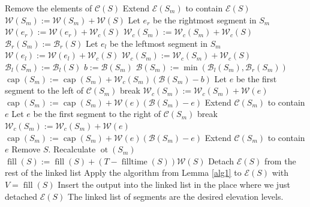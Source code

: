 \documentclass[11pt,a4paper]{article}
\DeclareMathOperator{\capp}{cap}
\DeclareMathOperator{\ot}{ot}
\DeclareMathOperator{\Fill}{fill}
\DeclareMathOperator{\filltime}{filltime}
\begin{document}
\begin{algorithmic}[1]
            \State Remove the elements of $\mathcal{C}(S)$ \label{a2:remcs}
            \State Extend $\mathcal{E}(S_m)$ to contain $\mathcal{E}(S)$ \label{a2:extend}
            \State $\mathcal{W}(S_m) := \mathcal{W}(S_m) + \mathcal{W}(S)$ \label{a2:addwsm}
              \State Let $e_r$ be the rightmost segment in $S_m$ \label{a2:geter2}
              \State $\mathcal{W}(e_r) := \mathcal{W}(e_r) + \mathcal{W}_c(S)$ \label{a2:addwer}
                \State $\mathcal{W}_c(S_m) := \mathcal{W}_c(S_m) + \mathcal{W}_c(S)$
              \EndIf
              \State $\mathcal{B}_r(S_m) := \mathcal{B}_r(S)$ \label{a2:bru}
            \Else
              \State Let $e_l$ be the leftmost segment in $S_m$
              \State $\mathcal{W}(e_l) := \mathcal{W}(e_l) + \mathcal{W}_c(S)$
                \State $\mathcal{W}_c(S_m) := \mathcal{W}_c(S_m) + \mathcal{W}_c(S)$
              \EndIf
              \State $\mathcal{B}_l(S_m) := \mathcal{B}_l(S)$ \label{a2:blu}
            \EndIf
            \State $b := \mathcal{B}(S_m)$
            \State $\mathcal{B}(S_m) := \min(\mathcal{B}_l(S_m), \mathcal{B}_r(S_m))$ \label{a2:bu}
            \State $\capp(S_m) := \capp(S_m) + \mathcal{W}_c(S_m)(\mathcal{B}(S_m) - b)$ \label{a2:inccap}
             \label{a2:walkstart}
              \State Let $e$ be the first segment to the left of $\mathcal{C}(S_m)$
                  \State break
              \EndIf
              \State $\mathcal{W}_c(S_m) := \mathcal{W}_c(S_m) + \mathcal{W}(e)$
              \State $\capp(S_m) := \capp(S_m) + \mathcal{W}(e)(\mathcal{B}(S_m) - e)$
              \State Extend $\mathcal{C}(S_m)$ to contain $e$ \label{a2:cext1} \label{a2:dec1}
            \EndWhile
              \State Let $e$ be the first segment to the right of $\mathcal{C}(S_m)$
                  \State break
              \EndIf
              \State $\mathcal{W}_c(S_m) := \mathcal{W}_c(S_m) + \mathcal{W}(e)$
              \State $\capp(S_m) := \capp(S_m) + \mathcal{W}(e)(\mathcal{B}(S_m) - e)$
              \State Extend $\mathcal{C}(S_m)$ to contain $e$ \label{a2:cext2} \label{a2:dec2}
            \EndWhile  \label{a2:walkstop}
            \State Remove $S$. \label{a2:rems2}
            \State Recalculate $\ot(S_m)$ \label{a2:recalotsm}
        \EndIf
    \EndWhile
      \State $\Fill(S) := \Fill(S) + (T - \filltime(S))\mathcal{W}(S)$
      \State Detach $\mathcal{E}(S)$ from the rest of the linked list
      \State Apply the algorithm from Lemma \ref{alg1} to $\mathcal{E}(S)$ with $V = \Fill(S)$
      \State Insert the output into the linked list in the place where we just detached $\mathcal{E}(S)$
    \EndFor
    \State The linked list of segments are the desired elevation levels.
\end{algorithmic}
\end{document}
